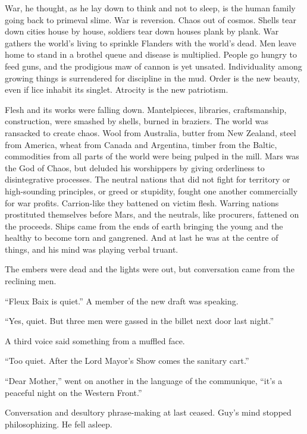 War, he thought, as he lay down to think and not to sleep, is the human family going back 
to primeval slime. War is reversion. Chaos out of cosmos. Shells tear down cities house 
by house, soldiers tear down houses plank by plank. War gathers the world's living to 
sprinkle Flanders with the world's dead. Men leave home to stand in a brothel queue and 
disease is multiplied. People go hungry to feed guns, and the prodigious maw of cannon is 
yet unsated. Individuality among growing things is surrendered for discipline in the mud. 
Order is the new beauty, even if lice inhabit its singlet. Atrocity is the new patriotism.

Flesh and its works were falling down. Mantelpieces, libraries, craftsmanship, construction, 
were smashed by shells, burned in braziers. The world was ransacked to create chaos. Wool 
from Australia, butter from New Zealand, steel from America, wheat from Canada and Argentina, 
timber from the Baltic, commodities from all parts of the world were being pulped in the 
mill. Mars was the God of Chaos, but deluded his worshippers by giving orderliness to 
disintegrative processes. The neutral nations that did not fight for territory or high-sounding 
principles, or greed or stupidity, fought one another commercially for war profits. Carrion-like 
they battened on victim flesh. Warring nations prostituted themselves before Mars, and the 
neutrals, like procurers, fattened on the proceeds. Ships came from the ends of earth bringing 
the young and the healthy to become torn and gangrened. And at last he was at the centre of 
things, and his mind was playing verbal truant.

The embers were dead and the lights were out, but conversation came from the reclining men.

``Fleux Baix is quiet.'' A member of the new draft was speaking.

``Yes, quiet. But three men were gassed in the billet next door last night.''

A third voice said something from a muffled face.

``Too quiet. After the Lord Mayor's Show comes the sanitary cart.''

``Dear Mother,'' went on another in the language of the communique, ``it's a peaceful night 
on the Western Front.''

Conversation and desultory phrase-making at last ceased. Guy's mind stopped philosophizing. He 
fell asleep.

